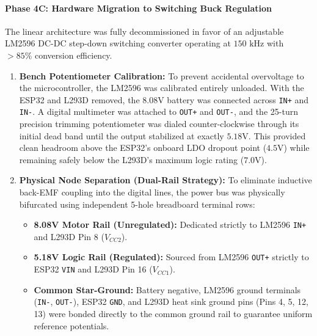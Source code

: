 \documentclass[journal,12pt,onecolumn]{IEEEtran}
\begin{document}
\paragraph*{\textbf{Phase 4C: Hardware Migration to Switching Buck Regulation}}
The linear architecture was fully decommissioned in favor of an adjustable LM2596 DC-DC step-down switching converter operating at $150\text{ kHz}$ with $>85\%$ conversion efficiency. %
\begin{enumerate}
	\item \textbf{Bench Potentiometer Calibration:} To prevent accidental overvoltage to the microcontroller, the LM2596 was calibrated entirely unloaded. %
	With the ESP32 and L293D removed, the $8.08\text{V}$ battery was connected across \texttt{IN+} and \texttt{IN-}. %
	A digital multimeter was attached to \texttt{OUT+} and \texttt{OUT-}, and the 25-turn precision trimming potentiometer was dialed counter-clockwise through its initial dead band until the output stabilized at exactly $5.18\text{V}$. %
	This provided clean headroom above the ESP32's onboard LDO dropout point ($4.5\text{V}$) while remaining safely below the L293D's maximum logic rating ($7.0\text{V}$). %
	
	\item \textbf{Physical Node Separation (Dual-Rail Strategy):} To eliminate inductive back-EMF coupling into the digital lines, the power bus was physically bifurcated using independent 5-hole breadboard terminal rows: %
	\begin{itemize}
		\item \textbf{8.08V Motor Rail (Unregulated):} Dedicated strictly to LM2596 \texttt{IN+} and L293D Pin 8 ($V_{CC2}$). %
		\item \textbf{5.18V Logic Rail (Regulated):} Sourced from LM2596 \texttt{OUT+} strictly to ESP32 \texttt{VIN} and L293D Pin 16 ($V_{CC1}$). %
		\item \textbf{Common Star-Ground:} Battery negative, LM2596 ground terminals (\texttt{IN-}, \texttt{OUT-}), ESP32 \texttt{GND}, and L293D heat sink ground pins (Pins 4, 5, 12, 13) were bonded directly to the common ground rail to guarantee uniform reference potentials. %
	\end{itemize}
\end{enumerate}
\end{document}

